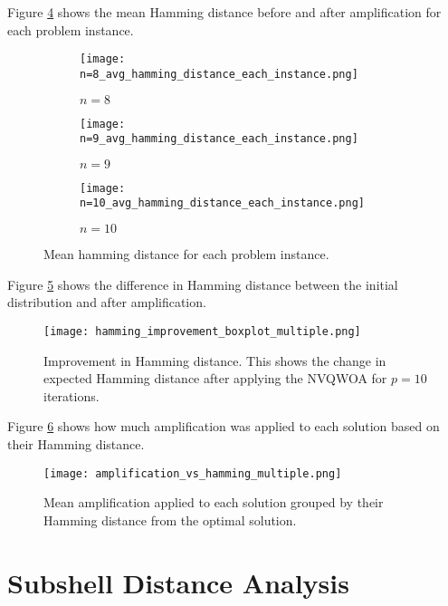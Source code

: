 Figure \ref{fig:avg ham} shows the mean Hamming distance before and after amplification for each problem instance.
\begin{figure}[htbp]
     \centering
     \begin{subfigure}{0.45\textwidth}
         \centering
         \texttt{[image: n=8\_avg\_hamming\_distance\_each\_instance.png]}
         \caption{$n=8$}
         \label{fig:avg ham 8}
     \end{subfigure}
     \hfill
     \begin{subfigure}{0.45\textwidth}
         \centering
         \texttt{[image: n=9\_avg\_hamming\_distance\_each\_instance.png]}
         \caption{$n=9$}
         \label{fig:avg ham 9}
     \end{subfigure}
     \hfill
     \begin{subfigure}{\textwidth}
         \centering
         \texttt{[image: n=10\_avg\_hamming\_distance\_each\_instance.png]}
         \caption{$n=10$}
         \label{fig:avg ham 10}
     \end{subfigure}
        \caption{Mean hamming distance for each problem instance.}
        \label{fig:avg ham}
\end{figure}

Figure \ref{fig:ham improvement} shows the difference in Hamming distance between the initial distribution and after amplification.
\begin{figure}[htbp]
    \centering
    \texttt{[image: hamming\_improvement\_boxplot\_multiple.png]}
    \caption{Improvement in Hamming distance. This shows the change in expected Hamming distance after applying the NVQWOA for $p=10$ iterations.}
    \label{fig:ham improvement}
\end{figure}

Figure \ref{fig:amp vs ham} shows how much amplification was applied to each solution based on their Hamming distance.
\begin{figure}[htbp]
    \centering
    \texttt{[image: amplification\_vs\_hamming\_multiple.png]}
    \caption{Mean amplification applied to each solution grouped by their Hamming distance from the optimal solution.}
    \label{fig:amp vs ham}
\end{figure}



\section{Subshell Distance Analysis}

